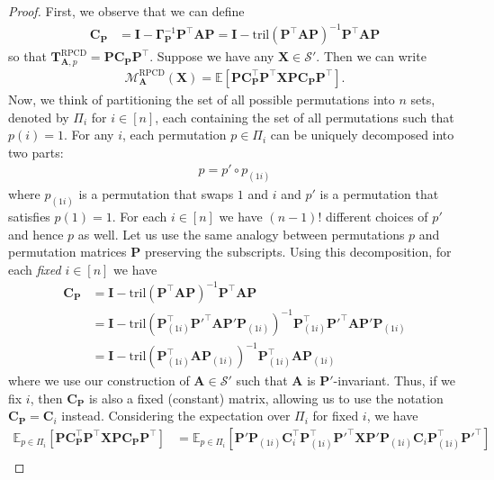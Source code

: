 \documentclass{article}
\theoremstyle{plain}
\theoremstyle{definition}
\theoremstyle{remark}
\def\bigclosed#1{\left[#1\right]}
\newcommand{\tril}{\mathrm{tril}}
\newcommand{\mGamma}{\bm{\Gamma}}
\newcommand{\RPCD}{\text{RPCD}} %
\newcommand{\MARPCD}{\mathcal{M}_{\bm{A}}^{\RPCD}} %
\def\mA{{\bm{A}}}
\def\mC{{\bm{C}}}
\def\mI{{\bm{I}}}
\def\mP{{\bm{P}}}
\def\mT{{\bm{T}}}
\def\mX{{\bm{X}}}
\def\gS{{\mathcal{S}}}
\newcommand{\E}{\mathbb{E}}
\begin{document}
\begin{proof}
    First, we observe that we can define
    \begin{align*}
        \mC_{\mP} &= \mI - \mGamma_{\mP}^{-1} \mP^{\top} \mA \mP = \mI - \tril(\mP^{\top} \mA \mP)^{-1} \mP^{\top} \mA \mP
    \end{align*}
    so that $\mT_{\mA, p}^{\RPCD} = \mP \mC_{\mP} \mP^{\top}$.
    Suppose we have any $\mX \in \gS'$.
    Then we can write
    \begin{align*}
        \MARPCD(\mX) = \E \bigclosed{\mP \mC_{\mP}^{\top} \mP^{\top} \mX \mP \mC_{\mP} \mP^{\top}}.
    \end{align*}
    Now, we think of partitioning the set of all possible permutations into $n$ sets, denoted by $\Pi_{i}$ for $i \in [n]$, each containing the set of all permutations such that $p(i) = 1$.
    For any $i$, each permutation $p \in \Pi_{i}$ can be uniquely decomposed into two parts:
    \begin{align*}
        p = p' \circ p_{(1 i)}
    \end{align*}
    where $p_{(1 i)}$ is a permutation that swaps $1$ and $i$ and $p'$ is a permutation that satisfies $p(1) = 1$.
    For each $i \in [n]$ we have $(n-1)!$ different choices of $p'$ and hence $p$ as well.
    Let us use the same analogy between permutations $p$ and permutation matrices $\mP$ preserving the subscripts.
    Using this decomposition, for each \emph{fixed} $i \in [n]$ we have
    \begin{align*}
        \mC_{\mP} &= \mI - \tril(\mP^{\top} \mA \mP)^{-1} \mP^{\top} \mA \mP \\
        &= \mI - \tril(\mP_{(1 i)}^{\top} \mP'^{\top} \mA \mP' \mP_{(1 i)})^{-1} \mP_{(1 i)}^{\top} \mP'^{\top} \mA \mP' \mP_{(1 i)} \\
        &= \mI - \tril(\mP_{(1 i)}^{\top} \mA \mP_{(1 i)})^{-1} \mP_{(1 i)}^{\top} \mA \mP_{(1 i)}
    \end{align*}
    where we use our construction of $\mA \in \gS'$ such that $\mA$ is $\mP'$-invariant.
    Thus, if we fix $i$, then $\mC_{\mP}$ is also a fixed (constant) matrix, allowing us to use the notation $\mC_{\mP} = \mC_{i}$ instead.
    Considering the expectation over $\Pi_i$ for fixed $i$, we have
    \begin{align*}
        \E_{p \in \Pi_{i}} \bigclosed{\mP \mC_{\mP}^{\top} \mP^{\top} \mX \mP \mC_{\mP} \mP^{\top}} &= \E_{p \in \Pi_{i}} \bigclosed{\mP' \mP_{(1 i)} \mC_{i}^{\top} \mP_{(1 i)}^{\top} \mP'^{\top} \mX \mP' \mP_{(1 i)} \mC_{i} \mP_{(1 i)}^{\top} \mP'^{\top}} \\

\end{align*}
\end{proof}
\end{document}
